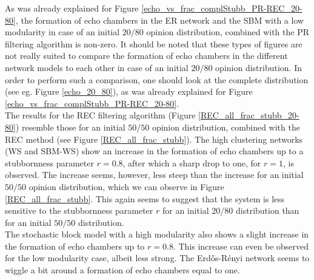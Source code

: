 \documentclass[11 pt , letterpaper , twoside , openright]{book}
\begin{document}
As was already explained for Figure \ref{echo_vs_frac_complStubb_PR-REC_20-80}, the formation of echo chambers in the ER network and the SBM with a low modularity in case of an initial $20/80$ opinion distribution, combined with the PR filtering algorithm is non-zero. It should be noted that these types of figures are not really suited to compare the formation of echo chambers in the different network models to each other in case of an initial $20/80$ opinion distribution. In order to perform such a comparison, one should look at the complete distribution (see eg. Figure \ref{echo_20_80}), as was already explained for Figure \ref{echo_vs_frac_complStubb_PR-REC_20-80}.\\
\newline
The results for the REC filtering algorithm (Figure \ref{REC_all_frac_stubb_20-80}) resemble those for an initial $50/50$ opinion distribution, combined with the REC method (see Figure \ref{REC_all_frac_stubb}). The high clustering networks (WS and SBM-WS) show an increase in the formation of echo chambers up to a stubbornness parameter $r=0.8$, after which a sharp drop to one, for $r=1$, is observed. The increase seems, however, less steep than the increase for an initial $50/50$ opinion distribution, which we can observe in Figure \ref{REC_all_frac_stubb}. This again seems to suggest that the system is less sensitive to the stubbornness parameter $r$ for an initial $20/80$ distribution than for an initial $50/50$ distribution.\\
The stochastic block model with a high modularity also shows a slight increase in the formation of echo chambers up to $r = 0.8$. This increase can even be observed for the low modularity case, albeit less strong. The Erd\H{o}s-R\'{e}nyi network seems to wiggle a bit around a formation of echo chambers equal to one.
\end{document}
